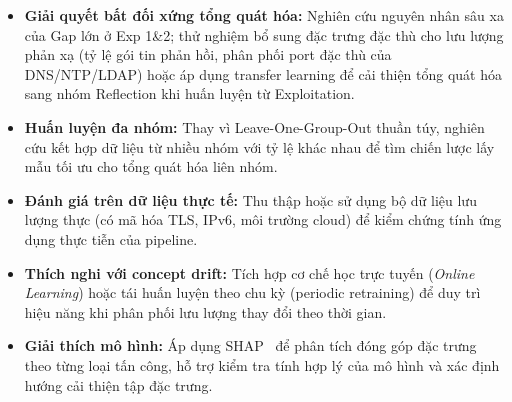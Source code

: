 \begin{itemize}
    \item \textbf{Giải quyết bất đối xứng tổng quát hóa:} Nghiên cứu nguyên nhân sâu xa của Gap lớn ở Exp 1\&2; thử nghiệm bổ sung đặc trưng đặc thù cho lưu lượng phản xạ (tỷ lệ gói tin phản hồi, phân phối port đặc thù của DNS/NTP/LDAP) hoặc áp dụng transfer learning để cải thiện tổng quát hóa sang nhóm Reflection khi huấn luyện từ Exploitation.

    \item \textbf{Huấn luyện đa nhóm:} Thay vì Leave-One-Group-Out thuần túy, nghiên cứu kết hợp dữ liệu từ nhiều nhóm với tỷ lệ khác nhau để tìm chiến lược lấy mẫu tối ưu cho tổng quát hóa liên nhóm.

    \item \textbf{Đánh giá trên dữ liệu thực tế:} Thu thập hoặc sử dụng bộ dữ liệu lưu lượng thực (có mã hóa TLS, IPv6, môi trường cloud) để kiểm chứng tính ứng dụng thực tiễn của pipeline.

    \item \textbf{Thích nghi với concept drift:} Tích hợp cơ chế học trực tuyến (\textit{Online Learning}) hoặc tái huấn luyện theo chu kỳ (periodic retraining) để duy trì hiệu năng khi phân phối lưu lượng thay đổi theo thời gian.

    \item \textbf{Giải thích mô hình:} Áp dụng SHAP~\cite{lundberg2017unified} để phân tích đóng góp đặc trưng theo từng loại tấn công, hỗ trợ kiểm tra tính hợp lý của mô hình và xác định hướng cải thiện tập đặc trưng.
\end{itemize}
